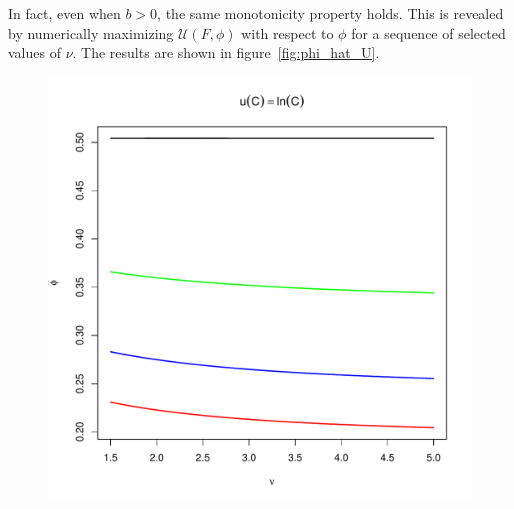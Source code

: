 \documentclass[11pt,a4]{amsart}
\newcommand{\1}{{\mathbf 1}}
\begin{document}
In fact, even when $b > 0$, the same monotonicity property holds. This
is revealed by numerically maximizing $\mathcal U(F, \phi)$ with
respect to $\phi$ for a sequence of selected values of $\nu$. The
results are shown in figure~\ref{fig:phi_hat_U}.
\begin{figure}[htb!]
  \begin{minipage}{0.5\linewidth}
    \includegraphics[width=\textwidth]{phi_hat_b_t_log.pdf}

\end{minipage}
\end{figure}
\end{document}
